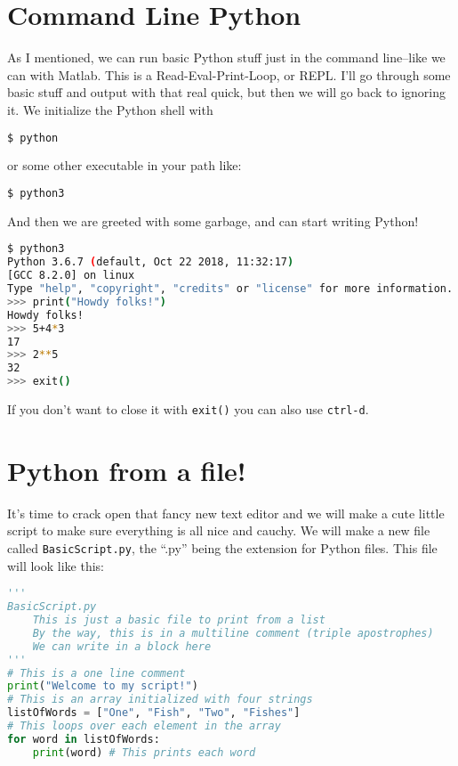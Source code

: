 \documentclass[12pt, twoside, reqno]{book}
\begin{document}
\section{Command Line Python}

As I mentioned, we can run basic Python stuff just in the command line--like we can with Matlab. This is a Read-Eval-Print-Loop, or REPL. I'll go through some basic stuff and output with that real quick, but then we will go back to ignoring it. We initialize the Python shell with
\begin{lstlisting}[language=sh]
$ python
\end{lstlisting}

or some other executable in your path like:
\begin{lstlisting}[language=sh]
$ python3
\end{lstlisting}

And then we are greeted with some garbage, and can start writing Python!
\begin{lstlisting}[language=sh]
$ python3
Python 3.6.7 (default, Oct 22 2018, 11:32:17) 
[GCC 8.2.0] on linux
Type "help", "copyright", "credits" or "license" for more information.
>>> print("Howdy folks!")
Howdy folks!
>>> 5+4*3
17
>>> 2**5
32
>>> exit()
\end{lstlisting}

If you don't want to close it with \texttt{exit()} you can also use \texttt{ctrl-d}.

\section{Python from a file!}

It's time to crack open that fancy new text editor and we will make a cute little script to make sure everything is all nice and cauchy. We will make a new file called \texttt{BasicScript.py}, the ``.py'' being the extension for Python files. This file will look like this:
\begin{lstlisting}[language=Python]
'''
BasicScript.py
    This is just a basic file to print from a list
    By the way, this is in a multiline comment (triple apostrophes)
    We can write in a block here
'''
# This is a one line comment
print("Welcome to my script!")
# This is an array initialized with four strings
listOfWords = ["One", "Fish", "Two", "Fishes"]
# This loops over each element in the array
for word in listOfWords:
    print(word) # This prints each word
\end{lstlisting}
\end{document}
